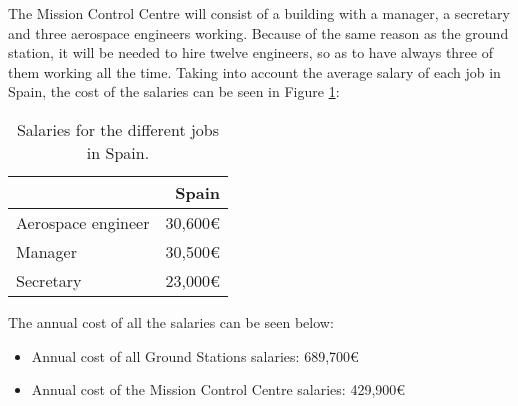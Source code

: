 The Mission Control Centre will consist of a building with a manager, a secretary and three aerospace engineers working. Because of the same reason as the ground station, it will be needed to hire twelve engineers, so as to have always three of them working all the time. Taking into account the average salary of each job in Spain, the cost of the salaries can be seen in Figure \ref{table:SalariesSpain}:
\begin{table}[H]
\begin{center}
\begin{tabular}{|l|r|}
\hline 
 & Spain \\ 
\hline 
Aerospace engineer & 30,600\euro \\ 
\hline 
Manager & 30,500\euro  \\ 
\hline 
Secretary & 23,000\euro  \\ 
\hline 
\end{tabular}
\end{center}
\caption[Salaries in Spain]{Salaries for the different jobs in Spain.}
\label{table:SalariesSpain}
\end{table}

The annual cost of all the salaries can be seen below:
\begin{itemize}
\item Annual cost of all Ground Stations salaries: 689,700\euro
\item Annual cost of the Mission Control Centre salaries: 429,900\euro
\end{itemize}